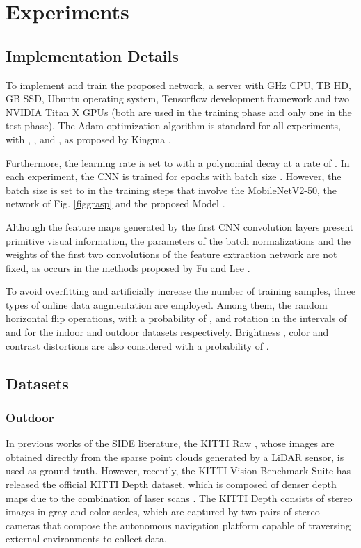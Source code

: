 \documentclass[5p]{elsarticle}
\begin{document}
\section{Experiments}
\label{results}

\subsection{Implementation Details}

To implement and train the proposed network, a server with GHz CPU, TB HD, GB SSD, Ubuntu  operating system, Tensorflow  development framework and two NVIDIA Titan X GPUs (both are used in the training phase and only one in the test phase). The Adam optimization algorithm \cite{kingma2014adam} is standard for all experiments, with , ,  and , as proposed by Kingma \etal \cite{kingma2014adam}. 

Furthermore, the learning rate is set to  with a polynomial decay at a rate of . In each experiment, the CNN is trained for  epochs with batch size . However, the batch size is set to  in the training steps that involve the MobileNetV2-50, the network of Fig. \ref{figgrasp} and the proposed Model .

Although the feature maps generated by the first CNN convolution layers present primitive visual information, the parameters of the batch normalizations and the weights of the first two convolutions of the feature extraction network are not fixed, as occurs in the methods proposed by Fu \etal\cite{fu2018deep} and Lee \etal\cite{lee2019big}.

To avoid overfitting and artificially increase the number of training samples, three types of online data augmentation are employed. Among them, the random horizontal flip operations, with a probability of , and rotation in the intervals of  and  for the indoor and outdoor datasets respectively. Brightness , color  and contrast  distortions are also considered with a probability of .

\subsection{Datasets}

\subsubsection{Outdoor}
\label{kittid}

In previous works of the SIDE literature, the KITTI Raw \cite{geiger2013vision}, whose images are obtained directly from the sparse point clouds generated by a LiDAR sensor, is used as ground truth. However, recently, the KITTI Vision Benchmark Suite has released the official KITTI Depth dataset, which is composed of denser depth maps due to the combination of  laser scans \cite{uhrig2017sparsity}. The KITTI Depth consists of stereo images in gray and color scales, which are captured by two pairs of stereo cameras that compose the autonomous navigation platform capable of traversing external environments to collect data.
\end{document}
